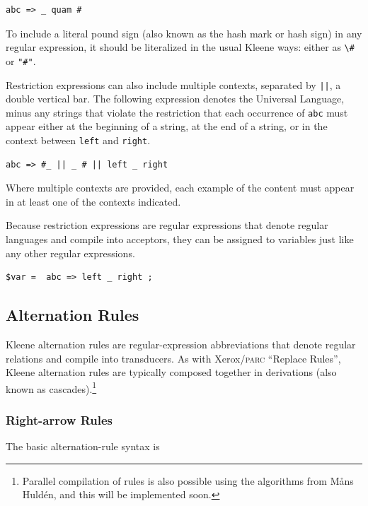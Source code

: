 \documentclass[letterpaper,12pt]{article}
\newcommand{\acro}{\textsc}
\begin{document}
\begin{Verbatim}[fontsize=\small]
abc => _ quam #
\end{Verbatim}

\noindent
To include a literal pound sign (also known as the hash mark or
hash sign) in any regular expression, it should be literalized in
the usual Kleene ways:  either as \verb!\#! or \verb!"#"!. 

Restriction expressions can also include multiple contexts, separated by
\texttt{||}, a double vertical bar.  The following expression denotes the
Universal Language, minus any strings that violate the restriction that
each occurrence of \texttt{abc} must appear either at the beginning of a
string, at the end of a string, or in the context between \texttt{left}
and \texttt{right}.

\begin{Verbatim}[fontsize=\small]
abc => #_ || _ # || left _ right 
\end{Verbatim}

\noindent
Where multiple contexts are provided, each example of the content
must appear in at least one of the contexts indicated.

Because restriction expressions are regular expressions that denote
regular languages and compile into acceptors, they can be assigned to
variables just like any other regular expressions.

\begin{Verbatim}[fontsize=\small]
$var =  abc => left _ right ;
\end{Verbatim}


\subsection{Alternation Rules}

Kleene alternation rules are regular-expression abbreviations that denote
regular relations and compile into transducers.  As with
Xerox/\acro{parc} ``Replace Rules'', Kleene alternation rules are
typically composed together in derivations (also known as
cascades).\footnote{Parallel compilation of rules is also possible using
the algorithms from M\r{a}ns Huld\'en, and this will be implemented
soon.}


\subsubsection{Right-arrow Rules}

The basic alternation-rule syntax is
\end{document}
